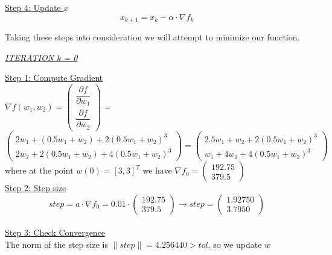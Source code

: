 \underline{Step 4: Update $x$}
\begin{equation}
	x_{k+1} = x_{k} - \alpha \cdot \nabla f_{k}
\end{equation}
\vspace{4mm}

Taking these steps into consideration we will attempt to minimize our function.\\

\begin{center}
	\underline{\textit{ITERATION k = 0}}
\end{center}

\underline{Step 1: Compute Gradient}\\
\(\nabla f(w_1,w_2) = \left(\begin{array}{c}
	\dfrac{\partial f}{\partial w_1} \\[4mm]
	\dfrac{\partial f}{\partial w_2}
\end{array}\right)\) = $\left(\begin{array}{c}
	2w_1 + (0.5w_1+w_2) + 2(0.5w_1+w_2)^3\\[1mm]
	2w_2 + 2(0.5w_1+w_2) + 4(0.5w_1+w_2)^3
\end{array}\right) = \left(\begin{array}{c}
	2.5w_1 + w_2 + 2(0.5w_1+w_2)^3\\[1mm]
	w_1 + 4w_2 + 4(0.5w_1+w_2)^3
\end{array}\right)$ \\[3mm]

where at the point $w\left(0\right) = \left[3, 3\right]^T$ we have $\nabla f_{0} = \left(\begin{array}{c}
	192.75 \\
	379.5
\end{array}\right)$
\\[4mm]

\underline{Step 2: Step size}
\[
step = a \cdot \nabla f_{0} = 0.01 \cdot \left(\begin{array}{c}
	192.75 \\
	379.5
\end{array}\right) \rightarrow step =\left(\begin{array}{c}
1.92750 \\
3.7950
\end{array}\right)
\]
\\[4mm]

\underline{Step 3: Check Convergence}\\
The norm of the step size is $\| step \| = 4.256440 > tol$, so we update $w$
\\[4mm]

